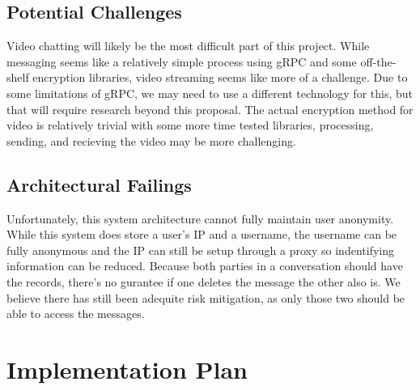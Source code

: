 \documentclass[titlepage]{article}
\begin{document}
    \subsection{Potential Challenges}

    Video chatting will likely be the most difficult part of this project.
    While messaging seems like a relatively simple process using gRPC and some off-the-shelf encryption libraries, video streaming seems like more of a challenge.
    Due to some limitations of gRPC, we may need to use a different technology for this, but that will require research beyond this proposal.
    The actual encryption method for video is relatively trivial with some more time tested libraries, processing, sending, and recieving the video may be more challenging.

    \subsection{Architectural Failings}

    Unfortunately, this system architecture cannot fully maintain user anonymity. 
    While this system does store a user's IP and a username, the username can be fully anonymous and the IP can still be setup through a proxy so indentifying information can be reduced.
    Because both parties in a conversation should have the records, there's no gurantee if one deletes the message the other also is. 
    We believe there has still been adequite risk mitigation, as only those two should be able to access the messages.

    \section{Implementation Plan}
\end{document}
